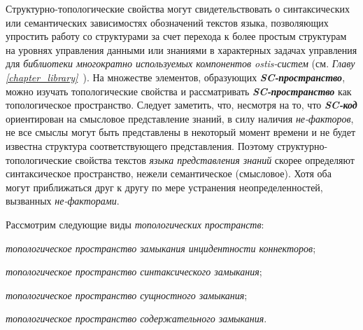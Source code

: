 Структурно-топологические свойства могут свидетельствовать о синтаксических или семантических зависимостях обозначений текстов языка, позволяющих упростить работу со структурами за счет перехода к более простым структурам на уровнях управления данными или знаниями в характерных задачах управления для \textit{библиотеки многократно используемых компонентов ostis-систем} (см. \textit{Главу \ref{chapter_library}~}).
На множестве элементов, образующих \textbf{\textit{SC-пространство}}, можно изучать топологические свойства и рассматривать \textbf{\textit{SC-пространство}} как топологическое пространство. Следует заметить, что, несмотря на то, что \textbf{\textit{SC-код}} ориентирован на смысловое представление знаний, в силу наличия \textit{не-факторов}, не все смыслы могут быть представлены в некоторый момент времени и не будет известна структура соответствующего представления. Поэтому структурно-топологические свойства текстов \textit{языка представления знаний} скорее определяют синтаксическое пространство, нежели семантическое (смысловое). Хотя оба могут приближаться друг к другу по мере устранения неопределенностей, вызванных \textit{не-факторами}.

Рассмотрим следующие виды \textit{топологических пространств}:
\begin{textitemize}
	\item \textit{топологическое пространство замыкания инцидентности коннекторов};
	\item \textit{топологическое пространство синтаксического замыкания};
	\item \textit{топологическое пространство сущностного замыкания};
	\item \textit{топологическое пространство содержательного замыкания}.
\end{textitemize}

\begin{SCn}
\end{SCn}

